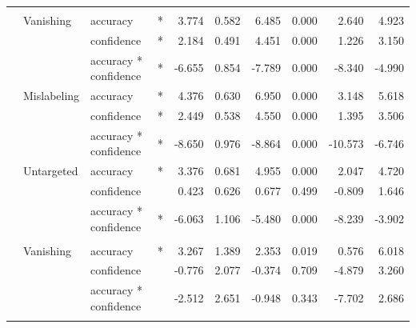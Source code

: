 \begin{longtable}[t]{llllrrrrrr}
\cmidrule{1-10}\pagebreak[0]
\addlinespace[0.3em]
\multicolumn{10}{l}{\textbf{SSD}}\\
\hspace{1em} & Vanishing & accuracy & * & 3.774 & 0.582 & 6.485 & 0.000 & 2.640 & 4.923\\
\cmidrule{3-10}\nopagebreak
\hspace{1em} &  & confidence & * & 2.184 & 0.491 & 4.451 & 0.000 & 1.226 & 3.150\\
\cmidrule{3-10}\nopagebreak
\hspace{1em} &  & accuracy * confidence & * & -6.655 & 0.854 & -7.789 & 0.000 & -8.340 & -4.990\\
\cmidrule{2-10}\nopagebreak
\hspace{1em} & Mislabeling & accuracy & * & 4.376 & 0.630 & 6.950 & 0.000 & 3.148 & 5.618\\
\cmidrule{3-10}\nopagebreak
\hspace{1em} &  & confidence & * & 2.449 & 0.538 & 4.550 & 0.000 & 1.395 & 3.506\\
\cmidrule{3-10}\nopagebreak
\hspace{1em} &  & accuracy * confidence & * & -8.650 & 0.976 & -8.864 & 0.000 & -10.573 & -6.746\\
\cmidrule{2-10}\nopagebreak
\hspace{1em} & Untargeted & accuracy & * & 3.376 & 0.681 & 4.955 & 0.000 & 2.047 & 4.720\\
\cmidrule{3-10}\nopagebreak
\hspace{1em} &  & confidence &  & 0.423 & 0.626 & 0.677 & 0.499 & -0.809 & 1.646\\
\cmidrule{3-10}\nopagebreak
\hspace{1em} &  & accuracy * confidence & * & -6.063 & 1.106 & -5.480 & 0.000 & -8.239 & -3.902\\
\cmidrule{1-10}\pagebreak[0]
\addlinespace[0.3em]
\multicolumn{10}{l}{\textbf{RetinaNet}}\\
\hspace{1em} & Vanishing & accuracy & * & 3.267 & 1.389 & 2.353 & 0.019 & 0.576 & 6.018\\
\cmidrule{3-10}\nopagebreak
\hspace{1em} &  & confidence &  & -0.776 & 2.077 & -0.374 & 0.709 & -4.879 & 3.260\\
\cmidrule{3-10}\nopagebreak
\hspace{1em} &  & accuracy * confidence &  & -2.512 & 2.651 & -0.948 & 0.343 & -7.702 & 2.686\\
\cmidrule{2-10}\nopagebreak

\end{longtable}
